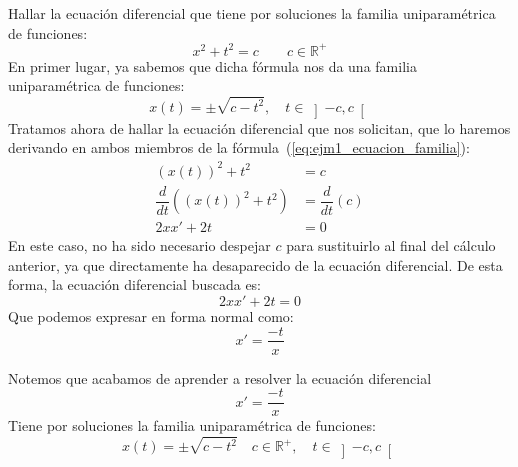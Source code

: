 \begin{ejemplo}
    Hallar la ecuación diferencial que tiene por soluciones la familia uniparamétrica de funciones:
    \begin{equation}\label{eq:ejm1_ecuacion_familia}
        x^2+t^2 = c\qquad c\in \mathbb{R}^+
    \end{equation}
    En primer lugar, ya sabemos que dicha fórmula nos da una familia uniparamétrica de funciones:
    \begin{equation*}
        x(t) = \pm \sqrt{c-t^2}, \quad t\in \left]-c,c\right[
    \end{equation*}
    Tratamos ahora de hallar la ecuación diferencial que nos solicitan, que lo haremos derivando en ambos miembros de la fórmula~(\ref{eq:ejm1_ecuacion_familia}):
    \begin{align*}
        {(x(t))}^{2}+t^2 &= c \\
        \dfrac{d}{dt}\left({(x(t))}^{2}+t^2 \right) &= \dfrac{d}{dt}(c) \\
        2xx' + 2t &= 0
    \end{align*}
    En este caso, no ha sido necesario despejar $c$ para sustituirlo al final del cálculo anterior, ya que directamente ha desaparecido de la ecuación diferencial. De esta forma, la ecuación diferencial buscada es:
    \begin{equation*}
        2xx' + 2t = 0
    \end{equation*}
    Que podemos expresar en forma normal como:
    \begin{equation*}
        x' = \dfrac{-t}{x}
    \end{equation*}
\end{ejemplo}

\begin{observacion}
    Notemos que acabamos de aprender a resolver la ecuación diferencial
    \begin{equation*}
        x' = \dfrac{-t}{x}
    \end{equation*}
    Tiene por soluciones la familia uniparamétrica de funciones:
    \begin{equation*}
        x(t) = \pm \sqrt{c-t^2} \quad c\in \mathbb{R}^+, \quad t\in \left]-c,c\right[
    \end{equation*}
\end{observacion}


